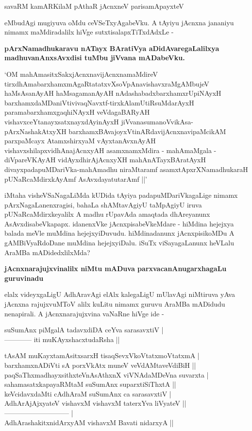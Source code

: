 \begin{shloka}
savaRM kamARKilaM pAthaR jAcnxneV parisamApayxteV
\end{shloka}

\noindent
eMbudAgi mugiyuva oMdu ceVSeTxyAgabeVku. A tAyiyu jAcnxna jananiyu nimamx maMdiradalilx hiVge sutxtisalapxTiTxdAdxLe -

{\bigskip
\noindent
{\large\bf pArxNamadhukaravu nATayx BAratiVya aDidAvaregaLalilxya madhuvanAnxsAvxdisi tuMbu jiVvana mADabeVku.}}\label{page81a}
\medskip

`OM mahAmasitxSakxjAcnxnavijAcnxnamaMdireV\label{81a} tirxdhAmabarxhamxmAgaRtatatxvXsoVpAnavishavxraMgAMbujeV haMsAsanAyAH haMsagamanAyAH nAdashabadxbarxhamxrUpiNAyxH barxhamxdaMDaniVtivivaqNavxtf-tirxkAlamUtiRsuMdarAyxH paramabarxhamxgaqhiNAyxH veVdagaBARyAH vishavxceYtanayxsatxnayxdAyinAyxH jiVvanasumanoVvikAsa-pArxNashakAtxyXH barxhamxBAvajoyxVtinARdavijAcnxnavipaMcikAM parxpaMcayx AtamxshirxyaM vAyxtanAvxnAyAH vishavxshilapxvidhAnajAcnxyAH asamxnamxMdira - mahAmaMgala - diVpareVKAyAH vidAyxdhirAjAcnxyXH mahAnATayxBAratAyxH divayxpadapuMDariVka-mahAmadhu niraMtaramf asamxtApxrXNamadhukaraH pUNaRcaMdirxkAyAmf AsAvxdayatutarAmf ||'

iMtaha visheVSaNagaLiMda kUDida tAyiya padapuMDariVkagaLige nimamx pArxNagaLanenxragisi, bahaLa shAMtavAgiyU taMpAgiyU iruva pUNaRcaMdirxkeyalilx A madhu rUpavAda amaqtada dhAreyanunx AsAvxdisabeVkapapx. idanenxVke jAcnxpisabeVkeMdare - hiMdina hejejxya balada meVle muMdina hejejxyiDuvudu. hiMdinadanunx jAcnxpisikoMDu A gAMBiVyaRdoDane muMdina hejejxyiDalu. iSuTx viSayagaLanunx heVLalu AraMBa mADidedxlilxMda?

{\bigskip
\noindent
{\large\bf jAcnxnarajujxvinalilx niMtu mADuva parxvacanAnugarxhagaLu guruvinadu}}\label{page82}
\medskip

\noindent
elalx videyxgaLigU AdhAravAgi elAlx kalegaLigU mUlavAgi niMtiruva yAva jAcnxna rajujxvuMToV alilx kuLitu nimamx guruvu AraMBa mADidudu nenapirali. A jAcnxnarajujxvina vaNaRne hiVge ide - 

\begin{shloka}
suSumAnx piMgalA tadavxdiDA ceYva sarasavxtiV |\\\label{82}
------------ iti muKAyxshacxtudaRsha ||
\end{shloka}

\begin{shloka}
tAsAM muKayxtamAsitxsarxH tisaqSevxVkoVtatxmoVtatxmA |\\
barxhamxnADiVti sA porxVkAtx muneV veVdAMtaveVdiBiH ||\\
paqSaThxmadhayxsithxteVnAsAthxnX viVNAdaMDeVna suvarxta |\\
sahamasatxkapayaRMtaM suSumAnx suparxtiSiThxtA ||\\

keVcidavxdaMti cAdhAraM suSumAnx ca sarasavxtiV |\\\label{82a}
AdhArAjAjxyateV vishavxM vishavxM taterxYva liVyateV ||\\
----------------------------- |\\
AdhArashakitxnidArxyAM vishavxM Bavati nidarxyA ||
\end{shloka}

